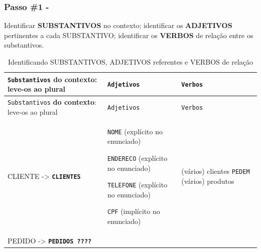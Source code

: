 \documentclass[
]{book}
\begin{document}
\subsubsection{Passo \#1 -}\label{passo-1---1}

Identificar \textbf{SUBSTANTIVOS} no contexto; identificar os \textbf{ADJETIVOS} pertinentes a cada SUBSTANTIVO; identificar os \textbf{VERBOS} de relação entre os substantivos.

\begin{longtable}[]{@{}
  >{\raggedright\arraybackslash}p{}
  >{\raggedright\arraybackslash}p{}
  >{\raggedright\arraybackslash}p{}@{}}
\caption{Identificando SUBSTANTIVOS, ADJETIVOS referentes e VERBOS de relação}\tabularnewline
\toprule\noalign{}
\begin{minipage}[b]{\linewidth}\raggedright
\texttt{Substantivos} \textbf{do contexto}: leve-os ao plural
\end{minipage} & \begin{minipage}[b]{\linewidth}\raggedright
\texttt{Adjetivos}
\end{minipage} & \begin{minipage}[b]{\linewidth}\raggedright
\texttt{Verbos}
\end{minipage} \\
\midrule\noalign{}
\endfirsthead
\toprule\noalign{}
\begin{minipage}[b]{\linewidth}\raggedright
\texttt{Substantivos} \textbf{do contexto}: leve-os ao plural
\end{minipage} & \begin{minipage}[b]{\linewidth}\raggedright
\texttt{Adjetivos}
\end{minipage} & \begin{minipage}[b]{\linewidth}\raggedright
\texttt{Verbos}
\end{minipage} \\
\midrule\noalign{}
\endhead
\bottomrule\noalign{}
\endlastfoot
CLIENTE -\textgreater{} \textbf{\texttt{CLIENTES}} & \texttt{NOME} (explícito no enunciado)

\texttt{ENDERECO} (explícito no enunciado)

\texttt{TELEFONE} (explícito no enunciado)

\texttt{CPF} (implícito no enunciado) & (vários) clientes \texttt{PEDEM} (vários) produtos \\
PEDIDO -\textgreater{} \textbf{\texttt{PEDIDOS\ ????}}


\end{longtable}
\end{document}
